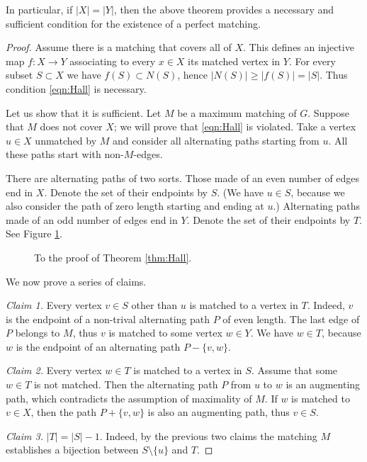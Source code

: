 In particular, if $|X| = |Y|$, then the above theorem provides a necessary and sufficient condition for the existence of a perfect matching.
\begin{proof}
Assume there is a matching that covers all of $X$.
This defines an injective map $f \colon X \to Y$ associating to every $x \in X$ its matched vertex in $Y$.
For every subset $S \subset X$ we have $f(S) \subset N(S)$, hence $|N(S)| \ge |f(S)| = |S|$.
Thus condition \eqref{eqn:Hall} is necessary.

Let us show that it is sufficient.
Let $M$ be a maximum matching of $G$.
Suppose that $M$ does not cover $X$; we will prove that \eqref{eqn:Hall} is violated.
Take a vertex $u \in X$ unmatched by $M$ and consider all alternating paths starting from $u$.
All these paths start with non-$M$-edges.

There are alternating paths of two sorts.
Those made of an even number of edges end in $X$.
Denote the set of their endpoints by $S$.
(We have $u \in S$, because we also consider the path of zero length starting and ending at $u$.)
Alternating paths made of an odd number of edges end in $Y$.
Denote the set of their endpoints by $T$.
See Figure \ref{fig:HallProof}.

\begin{figure}[ht]
\begin{center}

\end{center}
\caption{To the proof of Theorem \ref{thm:Hall}.}
\label{fig:HallProof}
\end{figure}

We now prove a series of claims.

\emph{Claim 1.} Every vertex $v \in S$ other than $u$ is matched to a vertex in $T$.
Indeed, $v$ is the endpoint of a non-trival alternating path $P$ of even length.
The last edge of $P$ belongs to $M$, thus $v$ is matched to some vertex $w \in Y$.
We have $w \in T$, because $w$ is the endpoint of an alternating path $P - \{v,w\}$.

\emph{Claim 2.} Every vertex $w \in T$ is matched to a vertex in $S$.
Assume that some $w \in T$ is not matched.
Then the alternating path $P$ from $u$ to $w$ is an augmenting path, which contradicts the assumption of maximality of $M$.
If $w$ is matched to $v \in X$, then the path $P + \{v,w\}$ is also an augmenting path, thus $v \in S$.

\emph{Claim 3.} $|T| = |S| - 1$.
Indeed, by the previous two claims the matching $M$ establishes a bijection between $S \setminus \{u\}$ and $T$.


\end{proof}
